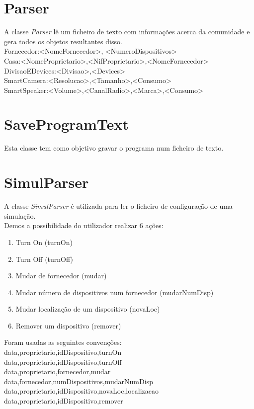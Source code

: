 \documentclass[11pt,a4paper]{report}
\begin{document}
    \section{Parser}
    
    A classe\textit{ Parser} lê um ficheiro de texto com informações acerca da comunidade e gera todos os objetos resultantes disso.\\
    Fornecedor:<NomeFornecedor>, <NumeroDispositivos>\\
    Casa:<NomeProprietario>,<NifProprietario>,<NomeFornecedor>\\
    DivisaoEDevices:<Divisao>,<Devices>\\
    SmartCamera:<Resolucao>,<Tamanho>,<Consumo>\\
    SmartSpeaker:<Volume>,<CanalRadio>,<Marca>,<Consumo>

    \section{SaveProgramText}
    
    Esta classe tem como objetivo gravar o programa num ficheiro de texto.
    
    \section{SimulParser}
    
    A classe \textit{SimulParser} é utilizada para ler o ficheiro de configuração de uma simulação.\\
    Demos a possibilidade do utilizador realizar 6 ações:
    \begin{enumerate}
    \item Turn On (turnOn)
    \item Turn Off (turnOff)
    \item Mudar de fornecedor (mudar)
    \item Mudar número de dispositivos num fornecedor (mudarNumDisp)
    \item Mudar localização de um dispositivo (novaLoc)
    \item Remover um dispositivo (remover)
    \end{enumerate}
    Foram usadas as seguintes convenções:\\
    data,proprietario,idDispositivo,turnOn\\
    data,proprietario,idDispositivo,turnOff\\
    data,proprietario,fornecedor,mudar\\
    data,fornecedor,numDispositivos,mudarNumDisp\\
    data,proprietario,idDispositivo,novaLoc,localizacao\\
    data,proprietario,idDispositivo,remover
    
\end{document}
